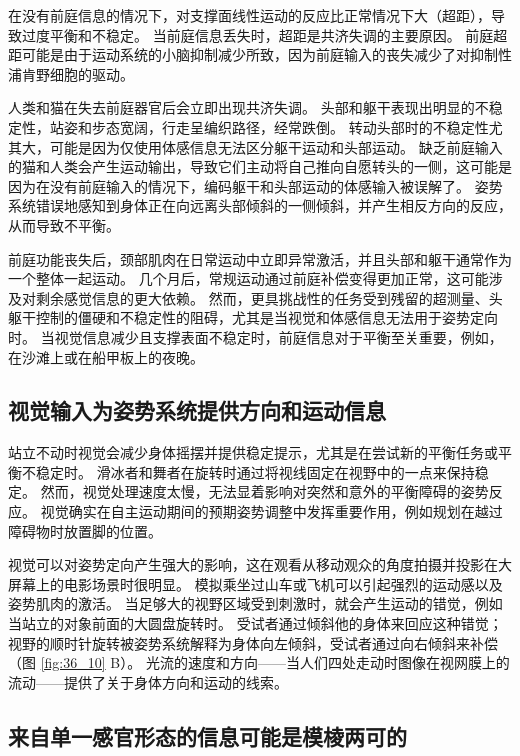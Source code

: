 在没有前庭信息的情况下，对支撑面线性运动的反应比正常情况下大（超距），导致过度平衡和不稳定。
当前庭信息丢失时，超距是共济失调的主要原因。
前庭超距可能是由于运动系统的小脑抑制减少所致，因为前庭输入的丧失减少了对抑制性浦肯野细胞的驱动。


人类和猫在失去前庭器官后会立即出现共济失调。
头部和躯干表现出明显的不稳定性，站姿和步态宽阔，行走呈编织路径，经常跌倒。
转动头部时的不稳定性尤其大，可能是因为仅使用体感信息无法区分躯干运动和头部运动。
缺乏前庭输入的猫和人类会产生运动输出，导致它们主动将自己推向自愿转头的一侧，这可能是因为在没有前庭输入的情况下，编码躯干和头部运动的体感输入被误解了。
姿势系统错误地感知到身体正在向远离头部倾斜的一侧倾斜，并产生相反方向的反应，从而导致不平衡。


前庭功能丧失后，颈部肌肉在日常运动中立即异常激活，并且头部和躯干通常作为一个整体一起运动。
几个月后，常规运动通过前庭补偿变得更加正常，这可能涉及对剩余感觉信息的更大依赖。
然而，更具挑战性的任务受到残留的超测量、头躯干控制的僵硬和不稳定性的阻碍，尤其是当视觉和体感信息无法用于姿势定向时。
当视觉信息减少且支撑表面不稳定时，前庭信息对于平衡至关重要，例如，在沙滩上或在船甲板上的夜晚。



\subsection{视觉输入为姿势系统提供方向和运动信息}

站立不动时视觉会减少身体摇摆并提供稳定提示，尤其是在尝试新的平衡任务或平衡不稳定时。
滑冰者和舞者在旋转时通过将视线固定在视野中的一点来保持稳定。
然而，视觉处理速度太慢，无法显着影响对突然和意外的平衡障碍的姿势反应。
视觉确实在自主运动期间的预期姿势调整中发挥重要作用，例如规划在越过障碍物时放置脚的位置。


视觉可以对姿势定向产生强大的影响，这在观看从移动观众的角度拍摄并投影在大屏幕上的电影场景时很明显。
模拟乘坐过山车或飞机可以引起强烈的运动感以及姿势肌肉的激活。
当足够大的视野区域受到刺激时，就会产生运动的错觉，例如当站立的对象前面的大圆盘旋转时。 受试者通过倾斜他的身体来回应这种错觉；
视野的顺时针旋转被姿势系统解释为身体向左倾斜，受试者通过向右倾斜来补偿（图 \ref{fig:36_10} B）。
光流的速度和方向——当人们四处走动时图像在视网膜上的流动——提供了关于身体方向和运动的线索。



\subsection{来自单一感官形态的信息可能是模棱两可的}

